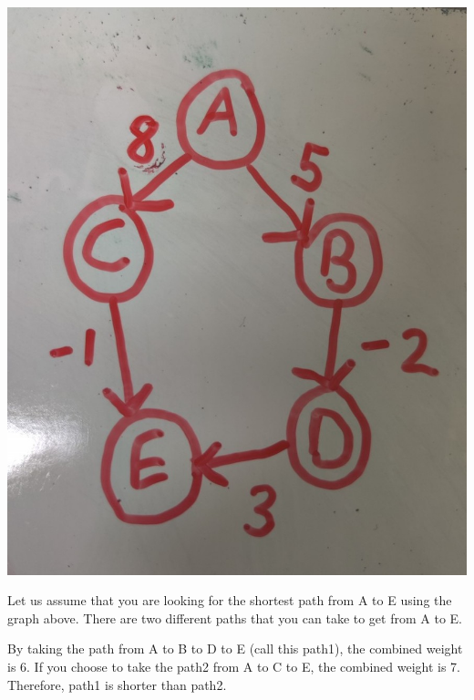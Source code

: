 \documentclass[11pt]{article}
\begin{document}
\begin{center}
\includegraphics[keepaspectratio=true,scale=0.25]{graph.jpg}
\end{center}
Let us assume that you are looking for the shortest path from A to E using the graph above. There are two different paths that you can take to get from A to E.

\begin{center}
\end{center}
By taking the path from A to B to D to E (call this path1), the combined weight is 6. If you choose to take the path2 from A to C to E, the combined weight is 7. Therefore, path1 is shorter than path2.
\end{document}
